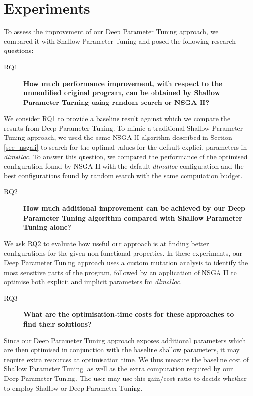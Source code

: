 
\section{Experiments}

To assess the improvement of our Deep Parameter Tuning approach, we compared it with Shallow Parameter Tuning and posed the following research questions: 
 

\begin{description}
 \item[RQ1] {\bf How much performance improvement, with respect to the unmodified original program, can be obtained by Shallow Parameter Turning using random search or NSGA II? }
\end{description}

We consider RQ1 to provide a baseline result against which we compare the results from Deep Parameter Tuning. To mimic a traditional Shallow Parameter Tuning approach, we used the same NSGA II algorithm described in Section \ref{sec_nsgaii} to search for the optimal values for the default explicit parameters in \emph{dlmalloc}. To answer this question, we compared the performance of the optimised configuration found by NSGA II with the default \emph{dlmalloc} configuration and the best configurations found by random search with the same computation budget.  

\begin{description}
\item[RQ2] {\bf How much additional improvement can be achieved by our Deep Parameter Tuning algorithm compared with Shallow Parameter Tuning alone? }
\end{description}

We ask RQ2 to evaluate how useful our approach is at finding better configurations for the given non-functional properties. In these experiments, our Deep Parameter Tuning approach uses a custom mutation analysis to identify the most sensitive parts of the program, followed by an application of NSGA II to optimise both explicit and implicit parameters for \emph{dlmalloc}. 

\begin{description}
\item[RQ3] {\bf What are the optimisation-time costs for these approaches to find their solutions? }
\end{description} 

Since our Deep Parameter Tuning approach exposes additional parameters
which are then optimised in conjunction with the baseline shallow
parameters, it may require extra resources at optimisation time.  
We thus measure the baseline cost of Shallow Parameter Tuning, as
well as the extra computation required by our Deep Parameter
Tuning. The user may use this gain/cost ratio to
decide whether to employ Shallow or Deep Parameter Tuning.

